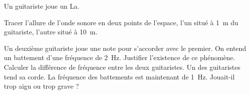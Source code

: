 

Un guitariste joue un La.

\question Tracer l'allure de l'onde sonore en deux points de l'espace, l'un situé à \SI{1}{m} du guitariste, l'autre situé à \SI{10}{m}.

\question Un deuxième guitariste joue une note pour s'accorder avec le premier. On entend un battement d'une fréquence de \SI{2}{Hz}.
\subquestion Justifier l’existence de ce phénomène. Calculer la différence de fréquence entre les deux guitaristes.
\subquestion Un des guitaristes tend sa corde. La fréquence des battements est maintenant de \SI{1}{Hz}. Jouait-il trop aigu ou trop grave ?
